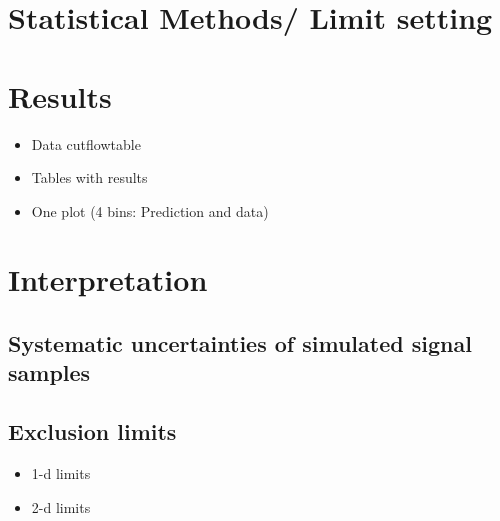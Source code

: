 \section{Statistical Methods/ Limit setting}
\label{sec:LimitSetting}

\section{Results}
\label{sec:Results}
\begin{itemize}
\item Data cutflowtable
\item Tables with results
\item One plot (4 bins: Prediction and data)
\end{itemize}

\section{Interpretation}
\label{sec:Interpretation}
\subsection{Systematic uncertainties of simulated signal samples}
\subsection{Exclusion limits}
\begin{itemize}
\item 1-d limits
\item 2-d limits
\end{itemize}

